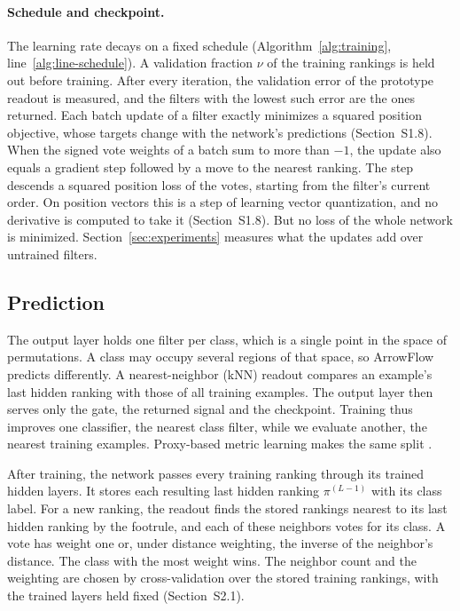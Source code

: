 \paragraph{Schedule and checkpoint.} The learning rate decays on a fixed schedule (Algorithm~\ref{alg:training}, line~\ref{alg:line-schedule}). A validation fraction $\nu$ of the training rankings is held out before training. After every iteration, the validation error of the prototype readout is measured, and the filters with the lowest such error are the ones returned. Each batch update of a filter exactly minimizes a squared position objective, whose targets change with the network's predictions (Section~S1.8). When the signed vote weights of a batch sum to more than $-1$, the update also equals a gradient step followed by a move to the nearest ranking. The step descends a squared position loss of the votes, starting from the filter's current order. On position vectors this is a step of learning vector quantization, and no derivative is computed to take it (Section~S1.8). But no loss of the whole network is minimized. Section~\ref{sec:experiments} measures what the updates add over untrained filters.

\subsection{Prediction}\label{sec:prediction}

The output layer holds one filter per class, which is a single point in the space of permutations. A class may occupy several regions of that space, so ArrowFlow predicts differently. A nearest-neighbor (kNN) readout compares an example's last hidden ranking with those of all training examples. The output layer then serves only the gate, the returned signal and the checkpoint. Training thus improves one classifier, the nearest class filter, while we evaluate another, the nearest training examples. Proxy-based metric learning makes the same split \citep{movshovitz2017nofuss}.

After training, the network passes every training ranking through its trained hidden layers. It stores each resulting last hidden ranking $\pi^{(L-1)}$ with its class label. For a new ranking, the readout finds the stored rankings nearest to its last hidden ranking by the footrule, and each of these neighbors votes for its class. A vote has weight one or, under distance weighting, the inverse of the neighbor's distance. The class with the most weight wins. The neighbor count and the weighting are chosen by cross-validation over the stored training rankings, with the trained layers held fixed (Section~S2.1).
